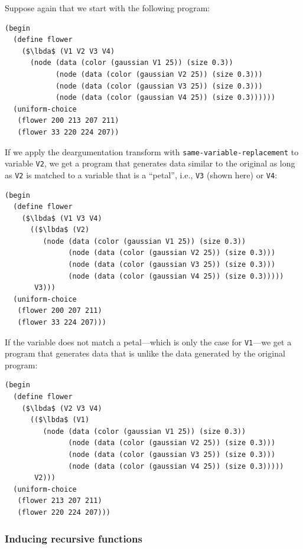 \documentclass[a4paper,10pt]{article}
\newcommand{\lbda}{\color[rgb]{0,.3,.7} \lambda}
\begin{document}
Suppose again that we start with the following program:
\begin{lstlisting}[mathescape=true]
(begin
  (define flower
    ($\lbda$ (V1 V2 V3 V4)
      (node (data (color (gaussian V1 25)) (size 0.3))
            (node (data (color (gaussian V2 25)) (size 0.3)))
            (node (data (color (gaussian V3 25)) (size 0.3)))
            (node (data (color (gaussian V4 25)) (size 0.3))))))
  (uniform-choice
   (flower 200 213 207 211)
   (flower 33 220 224 207))
\end{lstlisting}

If we apply the deargumentation transform with \texttt{same-variable-replacement} to variable \texttt{V2}, we get a program that generates data similar to the original as long as \texttt{V2} is matched to a variable that is a ``petal'', i.e., \texttt{V3} (shown here) or \texttt{V4}:

\begin{lstlisting}[mathescape=true]
(begin
  (define flower
    ($\lbda$ (V1 V3 V4)
      (($\lbda$ (V2)
         (node (data (color (gaussian V1 25)) (size 0.3))
               (node (data (color (gaussian V2 25)) (size 0.3)))
               (node (data (color (gaussian V3 25)) (size 0.3)))
               (node (data (color (gaussian V4 25)) (size 0.3)))))
       V3)))
  (uniform-choice
   (flower 200 207 211)
   (flower 33 224 207)))
\end{lstlisting}

If the variable does not match a petal---which is only the case for \texttt{V1}---we get a program that generates data that is unlike the data generated by the original program:

\begin{lstlisting}[mathescape=true]
(begin
  (define flower
    ($\lbda$ (V2 V3 V4)
      (($\lbda$ (V1)
         (node (data (color (gaussian V1 25)) (size 0.3))
               (node (data (color (gaussian V2 25)) (size 0.3)))
               (node (data (color (gaussian V3 25)) (size 0.3)))
               (node (data (color (gaussian V4 25)) (size 0.3)))))
       V2)))
  (uniform-choice
   (flower 213 207 211)
   (flower 220 224 207)))
\end{lstlisting}



\subsubsection{Inducing recursive functions}
\end{document}
